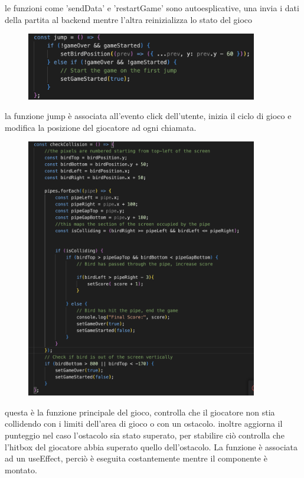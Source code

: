 \documentclass{article}
\begin{document}
le funzioni come 'sendData' e 'restartGame' sono autoesplicative, una invia i dati della partita al backend mentre l'altra reinizializza lo stato del gioco

\begin{figure}[H]
    \centering
    \includegraphics[width=0.9\textwidth]{images/jump.png}
\end{figure}

la funzione jump è associata all'evento click dell'utente, inizia il ciclo di gioco e modifica la posizione del giocatore ad ogni chiamata.

\begin{figure}[H]
    \centering
    \includegraphics[width=0.9\textwidth]{images/checkCollision.png}
\end{figure}
questa è la funzione principale del gioco, controlla che il giocatore non stia collidendo con i limiti dell'area di gioco o con un ostacolo. inoltre aggiorna il punteggio
nel caso l'ostacolo sia stato superato, per stabilire ciò controlla che l'hitbox del giocatore abbia superato quello dell'ostacolo.
La funzione è associata ad un useEffect, perciò è eseguita costantemente mentre il componente è montato.
\end{document}

